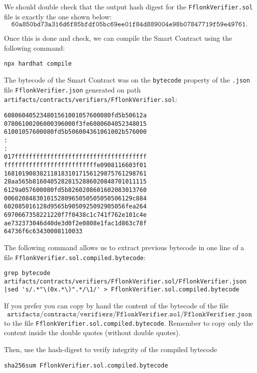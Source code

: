 We should double check that the output hash digest for the \texttt{FflonkVerifier.sol} file is exactly the one shown below:
\[
\texttt{60a850bd73a316d6f85bfdf05bc69ee01f84d889004e98b07847719f59e49761.}
\]

Once this is done and check, we can compile the Smart Contract using the following command:

\begin{lstlisting}[style=termt]
npx hardhat compile
\end{lstlisting}

The bytecode of the Smart Contract was on the \texttt{bytecode} property of the \texttt{.json} file \texttt{FflonkVerifier.json} generated on path \texttt{artifacts/contracts/verifiers/FflonkVerifier.sol}:

\begin{lstlisting}[style=termt]
608060405234801561001057600080fd5b50612a
07806100206000396000f3fe6080604052348015
61001057600080fd5b506004361061002b576000
:
:
017fffffffffffffffffffffffffffffffffffff
ffffffffffffffffffffffffffe0908116603f01
1681019083821181831017156129875761298761
28aa565b81604052828152886020848701011115
6129a057600080fd5b8260208601602083013760
006020848301015280965050505050506129c884
602085016128d9565b9050925092905056fea264
6970667358221220f7f0438c1c741f762e101c4e
ae732373046d40de3d0f2e0808e1fac1d863c78f
64736f6c63430008110033
\end{lstlisting}

The following command allows us to extract previous bytecode in one line of a file \texttt{FflonkVerifier.sol.compiled.bytecode}:

\begin{lstlisting}[style=termt]
grep bytecode artifacts/contracts/verifiers/FflonkVerifier.sol/FflonkVerifier.json |sed 's/.*"\(0x.*\)".*/\1/' > FflonkVerifier.sol.compiled.bytecode
\end{lstlisting}

If you prefer you can copy by hand the content of the bytecode of the file
\[
\texttt{artifacts/contracts/verifiers/FflonkVerifier.sol/FflonkVerifier.json}
\]
to the file \texttt{FflonkVerifier.sol.compiled.bytecode}. Remember to copy only the content inside the double quotes (without double quotes).

Then, use the hash-digest to verify integrity of the compiled bytecode

\begin{lstlisting}[style=termt]
sha256sum FflonkVerifier.sol.compiled.bytecode
\end{lstlisting}

